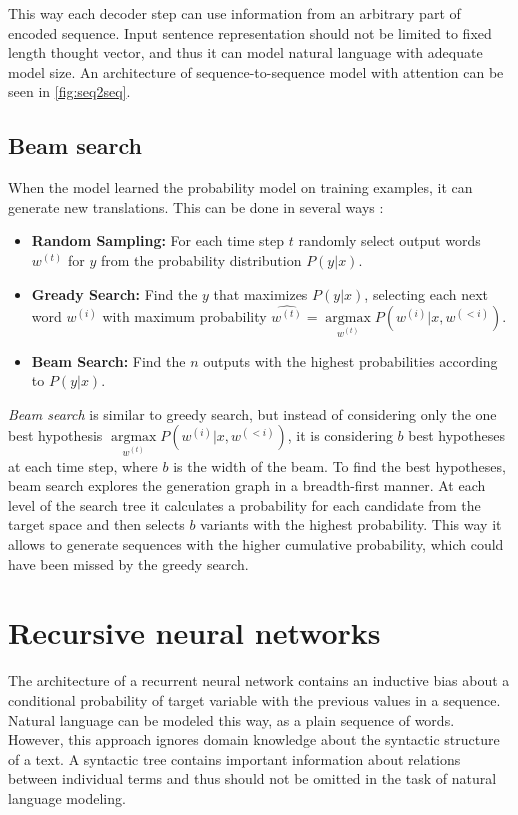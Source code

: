 This way each decoder step can use information from an arbitrary part of encoded sequence. Input sentence representation should not be limited to fixed length thought vector, and thus it can model natural language with adequate model size. An architecture of sequence-to-sequence model with attention can be seen in \cref{fig:seq2seq}.

\subsection{Beam search} \label{beam}
When the model learned the probability model on training examples, it can generate new translations. This can be done in several ways \parencite{Neubig2017}:
        \begin{itemize}
    	\item \textbf{Random Sampling:} For each time step $t$ randomly select output words $w^{(t)}$ for $y$ from the probability distribution $P(y|x)$.
    	\item \textbf{Gready Search:} Find the $y$ that maximizes $P(y|x)$, selecting each next word $w^{(i)}$ with maximum probability $\hat{w^{(t)}} = \underset{w^{(t)}}{\operatorname{argmax}} P(w^{(i)}|x, w^{(<i)})$.
    	\item \textbf{Beam Search:} Find the $n$ outputs with the highest probabilities according to $P(y|x)$.
    \end{itemize}

\emph{Beam search} is similar to greedy search, but instead of considering only the one best hypothesis $\underset{w^{(t)}}{\operatorname{argmax}} P(w^{(i)}|x, w^{(<i)})$, it is considering $b$ best hypotheses at each time step, where $b$ is the width of the beam. To find the best hypotheses, beam search explores the generation graph in a breadth-first manner. At each level of the search tree it calculates a probability for each candidate from the target space and then selects $b$ variants with the highest probability. This way it allows to generate sequences with the higher cumulative probability, which could have been missed by the greedy search.

\section{Recursive neural networks} \label{sec:rvnn}
The architecture of a recurrent neural network contains an inductive bias about a conditional probability of target variable with the previous values in a sequence. Natural language can be modeled this way, as a plain sequence of words. However, this approach ignores domain knowledge about the syntactic structure of a text. A syntactic tree contains important information about relations between individual terms and thus should not be omitted in the task of natural language modeling.

